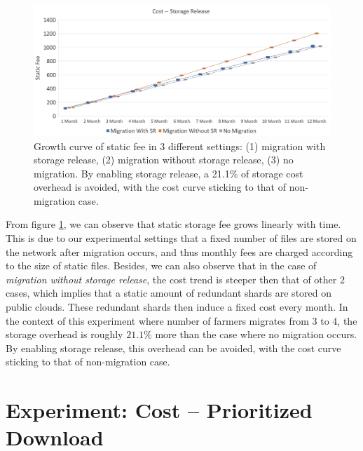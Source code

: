 \begin{figure}[hbt]
  \centering
    \includegraphics[width=14cm]{charts/chart_cost_storage_release.png}
    \caption[Growth curve of static fee in 3 different settings: (1) migration with storage release, (2) migration without storage release, (3) no migration]{Growth curve of static fee in 3 different settings: (1) migration with storage release, (2) migration without storage release, (3) no migration. By enabling storage release, a 21.1\% of storage cost overhead is avoided, with the cost curve sticking to that of non-migration case.}
    \label{fig:coststoragerelease}
\end{figure}

From figure \ref{fig:coststoragerelease}, we can observe that static storage fee grows linearly with time. This is due to our experimental settings that a fixed number of files are stored on the network after migration occurs, and thus monthly fees are charged according to the size of static files. Besides, we can also observe that in the case of \textit{migration without storage release}, the cost trend is steeper then that of other 2 cases, which implies that a static amount of redundant shards are stored on public clouds. These redundant shards then induce a fixed cost every month. In the context of this experiment where number of farmers migrates from 3 to 4, the storage overhead is roughly $21.1\%$ more than the case where no migration occurs. By enabling storage release, this overhead can be avoided, with the cost curve sticking to that of non-migration case.

\section{Experiment: Cost -- Prioritized Download}
\label{s:expcostprioritizeddownload}

